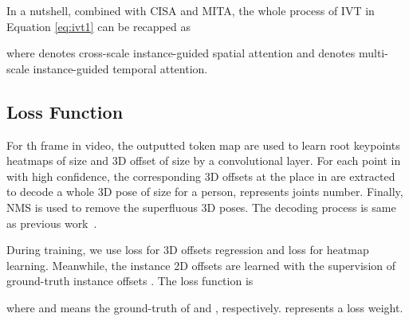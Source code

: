 \documentclass[sigconf]{acmart}
\begin{document}
In a nutshell, combined with CISA and MITA, the whole process of IVT in Equation \ref{eq:ivt1} can be recapped as 

where  denotes cross-scale instance-guided spatial attention and  denotes multi-scale instance-guided temporal attention.

\subsection{Loss Function}
\label{decoding}

For th frame in video, the outputted token map  are used to learn root keypoints heatmaps  of size  and 3D offset  of size  by a convolutional layer. For each point  in  with high confidence, the corresponding 3D offsets at the  place in  are extracted to decode a whole 3D pose of size  for a person,  represents joints number. Finally, NMS is used to remove the superfluous 3D poses. The decoding process is same as previous work~\cite{nie2019single,zhou2019objects}.

During training, we use  loss for 3D offsets regression and  loss for heatmap learning. Meanwhile, the instance 2D offsets  are learned with the supervision of ground-truth instance offsets .
The loss function  is

where  and  means the ground-truth of  and , respectively.  represents a loss weight.
\end{document}
